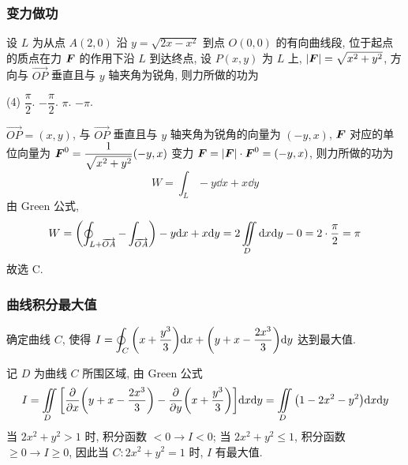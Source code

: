 \subsubsection{变力做功}

\begin{example}
    设 $L$ 为从点 $A(2,0)$ 沿 $y=\sqrt{2x-x^2}$ 到点 $O(0,0)$ 的有向曲线段, 位于起点的质点在力 $\vb*{F}$ 的作用下沿 $L$ 到达终点, 设 $P(x,y)$ 为 $L$ 上, $|\vb*{F}|=\sqrt{x^2+y^2}$, 方向与 $\overrightarrow{OP} $ 垂直且与 $y$ 轴夹角为锐角, 则力所做的功为 
    \begin{tasks}(4)
        \task $\dfrac{\pi}{2}$.
        \task $-\dfrac{\pi}{2}$.
        \task $\pi$.
        \task $-\pi$.
    \end{tasks}
\end{example}
\begin{solution}
    $\overrightarrow{OP} =(x,y)$, 与 $\overrightarrow{OP} $ 垂直且与 $y$ 轴夹角为锐角的向量为 $(-y,x)$, $\vb*{F}$ 对应的单位向量为 $ \vb*{F}^0=\dfrac{1}{\sqrt{x^2+y^2}}(-y,x) $
    变力 $\vb*{F}=|\vb*{F}|\cdot \vb*{F}^0=(-y,x)$, 则力所做的功为
    $$
    W=\int_L-y \dd x+x \dd y
    $$
    由 Green 公式, 
    $$
    W=\qty(\oint_{L+\overrightarrow{OA}}-\int_{\overrightarrow{OA}})-y \dd x + x \dd y=2\iint\limits_D \dd x \dd y -0=2\cdot\dfrac{\pi}{2}=\pi
    $$
    故选 C.
\end{solution}

\subsubsection{曲线积分最大值}

\begin{example}
    确定曲线 $C$, 使得 $\displaystyle I=\oint_C\qty(x+\dfrac{y^3}{3})\dd x+\qty(y+x-\dfrac{2x^3}{3})\dd y$ 达到最大值.
\end{example}
\begin{solution}
    记 $D$ 为曲线 $C$ 所围区域, 由 Green 公式 $$
        I=\iint\limits_D\qty[\pdv{x}\qty(y+x-\dfrac{2x^3}{3})-\pdv{y}\qty(x+\dfrac{y^3}{3})]\dd x\dd y=\iint\limits_D\qty(1-2x^2-y^2)\dd x\dd y
    $$
    当 $2x^2+y^2>1$ 时, 积分函数 $<0\to I<0$; 当 $2x^2+y^2\leqslant 1$, 积分函数 $\geqslant 0\to I\geqslant 0$, 因此当 $C:2x^2+y^2=1$ 时, $I$ 有最大值.
\end{solution}

